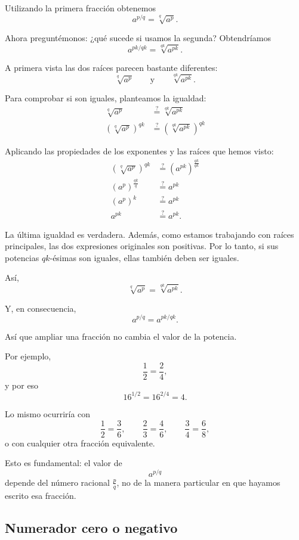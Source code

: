 Utilizando la primera fracción obtenemos
\[
a^{p/q}
=
\sqrt[q]{a^p}.
\]

Ahora preguntémonos: ¿qué sucede si usamos la segunda?
Obtendríamos
\[
a^{pk/qk}
=
\sqrt[qk]{a^{pk}}.
\]

A primera vista las dos raíces parecen bastante diferentes:
\[
\sqrt[q]{a^p}
\qquad\text{y}\qquad
\sqrt[qk]{a^{pk}}.
\]

Para comprobar si son iguales, planteamos la igualdad:
\begin{align*}
  \sqrt[q]{a^p} &\stackrel{?}{=} \sqrt[qk]{a^{pk}} \\ 
  \left(\sqrt[q]{a^p}\right)^{qk}
  &\stackrel{?}{=}
  \left(\sqrt[qk]{a^{pk}}\right)^{qk}
\end{align*}

Aplicando las propiedades de los exponentes y las raíces que hemos visto:
\begin{align*}
  \left(\sqrt[q]{a^p}\right)^{qk}
  &\stackrel{?}{=}
  \left(a^{pk}\right)^{\frac{qk}{qk}} \\ 
  \left(a^p\right)^{\frac{qk}{q}}
  &\stackrel{?}{=}
  a^{pk} \\ 
  \left(a^p\right)^k
  &\stackrel{?}{=}
  a^{pk} \\ 
  a^{pk}
  &\stackrel{?}{=}
  a^{pk}.
\end{align*}

La última igualdad es verdadera. Además, como estamos trabajando con raíces principales, las dos expresiones originales son positivas. Por lo tanto, si sus potencias \(qk\)-ésimas son iguales, ellas también deben ser iguales.

Así,
\[
\sqrt[q]{a^p}
=
\sqrt[qk]{a^{pk}}.
\]

Y, en consecuencia,
\[
\boxed{
a^{p/q}=a^{pk/qk}
}.
\]

Así que ampliar una fracción no cambia el valor de la potencia.

Por ejemplo,
\[
\frac12=\frac24,
\]
y por eso
\[
16^{1/2}
=
16^{2/4}
=
4.
\]

Lo mismo ocurriría con
\[
\frac12=\frac36,
\qquad
\frac23=\frac46,
\qquad
\frac34=\frac68,
\]
o con cualquier otra fracción equivalente.

Esto es fundamental: el valor de
\[
a^{p/q}
\]
depende del número racional \(\frac pq\), no de la manera particular en que hayamos escrito esa fracción.

\subsection{Numerador cero o negativo}

